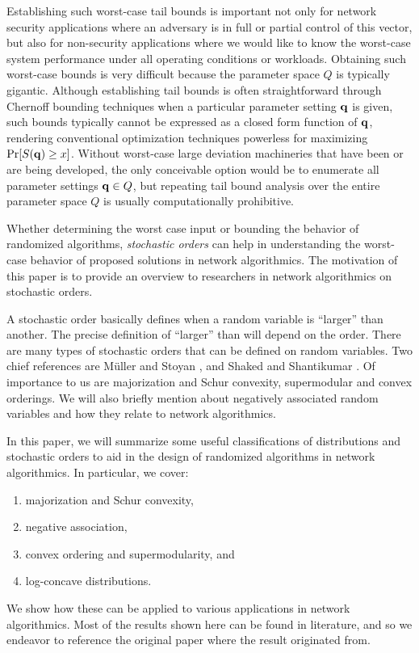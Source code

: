 Establishing such worst-case tail bounds is important not only for network
security applications where an adversary is in full or partial control of
this vector, but also for non-security applications where we would like to
know the worst-case system performance under all operating conditions or workloads.
Obtaining such worst-case bounds is very difficult because the parameter
space $Q$ is typically gigantic. Although establishing tail bounds is
often straightforward through Chernoff bounding
techniques when a particular parameter setting $\mathbf{q}$ is given,
such bounds typically cannot be expressed as a closed form function of $\mathbf{q}$,
rendering conventional optimization techniques powerless for maximizing $\Pr[S(\mathbf{q}) \ge x]$.
Without worst-case large deviation machineries that have been or are being developed, the only
conceivable option would be to enumerate all parameter settings $\mathbf{q}\in Q$, but repeating tail
bound analysis over the entire parameter space $Q$ is usually computationally prohibitive.

Whether determining the worst case input or bounding the
behavior of randomized algorithms, \textit{stochastic orders} can help in understanding the worst-case behavior of proposed
solutions in network algorithmics. The motivation of this paper is to provide an overview to researchers in
network algorithmics on stochastic orders.

A stochastic order basically defines when a random variable is ``larger'' than another. The precise definition
of ``larger'' than will depend on the order. 
There are many types of stochastic orders that can be defined on random variables. Two chief references are
M\"{u}ller and Stoyan \cite{Muller02Risk}, and Shaked and Shantikumar \cite{Shaked07Sorders}. Of importance
to us are majorization and Schur convexity, supermodular and convex orderings. We will also briefly mention about negatively associated
random variables and how they relate to network algorithmics.

In this paper, we will summarize some useful classifications of distributions and stochastic orders to aid
in the design of randomized algorithms in network algorithmics. 
In particular, we cover:
\begin{enumerate}
\item majorization and Schur convexity, 
\item negative association,
\item convex ordering and supermodularity, and
\item log-concave distributions.
\end{enumerate}
We show how these can be applied to various applications in network algorithmics. Most of the 
results shown here can be found in literature, and so we endeavor to reference the original 
paper where the result originated from. 





